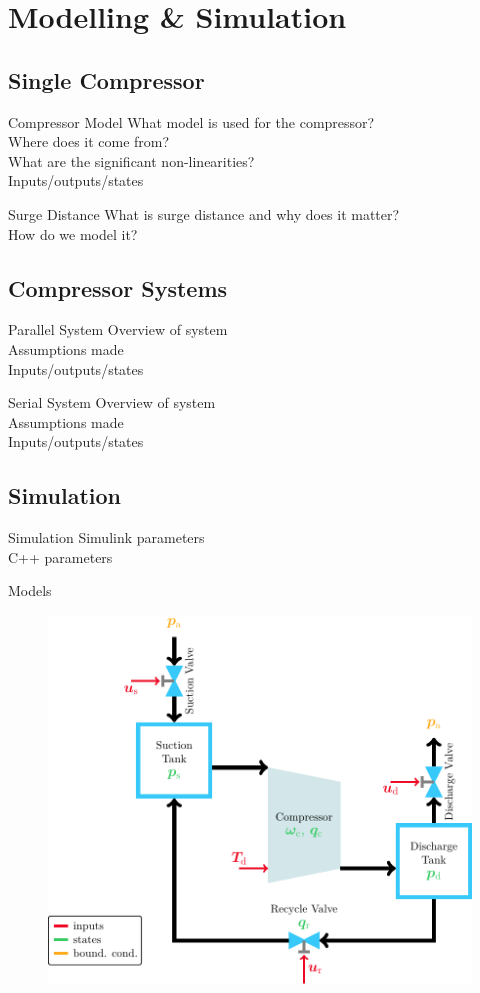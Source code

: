 \section{Modelling \& Simulation}

\subsection{Single Compressor}
\begin{frame}{Compressor Model}
  What model is used for the compressor?\\
  Where does it come from?\\
  What are the significant non-linearities?\\
  Inputs/outputs/states
\end{frame}

\begin{frame}{Surge Distance}
  What is surge distance and why does it matter?\\
  How do we model it?\\
\end{frame}

\subsection{Compressor Systems}

\begin{frame}{Parallel System}
  Overview of system\\
  Assumptions made\\
  Inputs/outputs/states
\end{frame}

\begin{frame}{Serial System}
  Overview of system\\
  Assumptions made\\
  Inputs/outputs/states
\end{frame}

\subsection{Simulation}
\begin{frame}{Simulation}
  Simulink parameters\\
  C++ parameters
\end{frame}


\begin{frame}{Models}
  \begin{figure}[H]
    \centering
    \includegraphics[width=.5\linewidth]{figures/compressor.pdf}
  \end{figure}
\end{frame}

